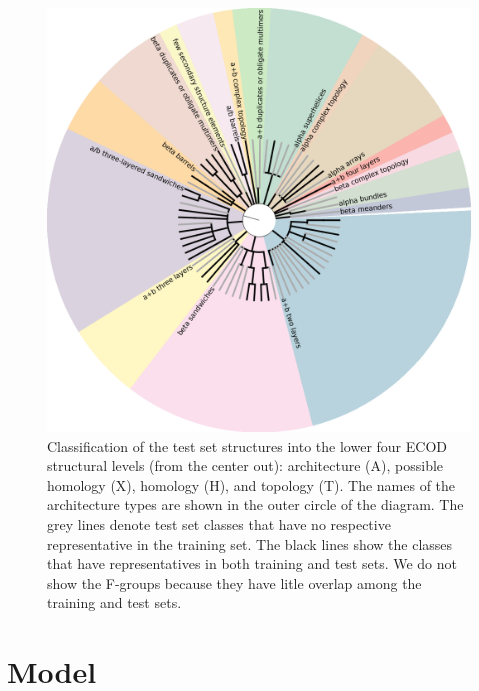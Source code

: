 \documentclass[letter,10pt]{article}
\begin{document}
\begin{figure}[H]
    \centering
    \includegraphics[width=\linewidth]{Fig/folds_graph.png}
%
    \caption{Classification of the test set structures into the lower
    four ECOD structural levels (from the center out): architecture
    (A), possible homology (X), homology (H), and topology (T). The
    names of the architecture types are shown in the outer circle of
    the diagram.
    The grey lines denote test set classes that have no
    respective representative in the training set. The black lines
    show the classes that have representatives in both training and
    test sets. We do not show the F-groups because they have litle
    overlap among the training and test sets.
}
%
    \label{Fig:foldsGraph}
\end{figure}

\section{Model}
\end{document}
